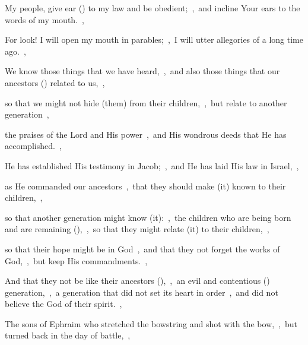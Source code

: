\documentclass[12pt,twoside,a5paper]{article}
\begin{document}





\begin{normalparskip}
  My people, give ear () to my law and be obedient;~\sep\ and incline Your ears to the words of my mouth.~\sep


  For look! I will open my mouth in parables;~\sep\ I will utter allegories of a long time ago.~\sep

  We know those things that we have heard,~\sep\ and also those things that our ancestors () related to us,~\sep

  so that we might not hide (them) from their children,~\sep\ but relate to another generation~\sep

  the praises of the Lord and His power~\sep\ and His wondrous deeds that He has accomplished.~\sep

  He has established His testimony in Jacob;~\sep\ and He has laid His law in Israel,~\sep

  as He commanded our ancestors~\sep\ that they should make (it) known to their children,~\sep

  so that another generation might know (it):~\sep\ the children who are being born and are remaining (),~\sep\ so that they might relate (it) to their children,~\sep

  so that their hope might be in God~\sep\ and that they not forget the works of God,~\sep\ but keep His commandments.~\sep

  And that they not be like their ancestors (),~\sep\ an evil and contentious () generation,~\sep\ a generation that did not set its heart in order~\sep\ and did not believe the God of their spirit.~\sep

  The sons of Ephraim who stretched the bowstring and shot with the bow,~\sep\ but turned back in the day of battle,~\sep


\end{normalparskip}
\end{document}
